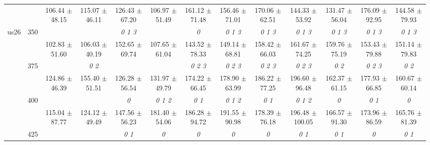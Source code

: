 \begin{table}[h]
{\begin{tabular}{
        ccccccccccccc}
 & & \cellcolor[HTML]{EFEFEF} 106.44 $\pm$ 48.15& \cellcolor[HTML]{EFEFEF} 115.07 $\pm$ 46.11& \cellcolor[HTML]{EFEFEF} 126.43 $\pm$ 67.20& \cellcolor[HTML]{EFEFEF} 106.97 $\pm$ 51.49& \cellcolor[HTML]{EFEFEF} 161.12 $\pm$ 71.48& \cellcolor[HTML]{EFEFEF} 156.46 $\pm$ 71.01& \cellcolor[HTML]{EFEFEF} 170.06 $\pm$ 62.51& \cellcolor[HTML]{EFEFEF} 144.33 $\pm$ 53.92& \cellcolor[HTML]{EFEFEF} 131.47 $\pm$ 56.04& \cellcolor[HTML]{EFEFEF} 176.09 $\pm$ 92.95& \cellcolor[HTML]{EFEFEF} 144.58 $\pm$ 79.93 \\ 
 \multirow{4}{*}{us26} & \multirow{2}{*}{350}& & & \textit{ 0 1 3 }& & \textit{ 0 }& \textit{ 0 1 3 }& \textit{ 0 1 3 }& \textit{ 0 1 3 }& \textit{ 0 1 3 }& \textit{ 0 1 3 }& \textit{ 0 1 3 } \\ 
 & & 102.83 $\pm$ 51.60& 106.03 $\pm$ 40.19& 152.65 $\pm$ 69.74& 107.65 $\pm$ 61.04& 143.52 $\pm$ 78.33& 149.14 $\pm$ 68.81& 158.42 $\pm$ 66.03& 161.67 $\pm$ 74.25& 159.76 $\pm$ 75.19& 153.43 $\pm$ 79.88& 151.14 $\pm$ 79.83 \\ 
 & \multirow{2}{*}{375}& \cellcolor[HTML]{EFEFEF} & \cellcolor[HTML]{EFEFEF} \textit{ 0 2 }& \cellcolor[HTML]{EFEFEF} & \cellcolor[HTML]{EFEFEF} & \cellcolor[HTML]{EFEFEF} \textit{ 0 2 3 }& \cellcolor[HTML]{EFEFEF} \textit{ 0 2 3 }& \cellcolor[HTML]{EFEFEF} \textit{ 0 2 3 }& \cellcolor[HTML]{EFEFEF} \textit{ 0 2 3 }& \cellcolor[HTML]{EFEFEF} \textit{ 0 2 }& \cellcolor[HTML]{EFEFEF} \textit{ 0 2 3 }& \cellcolor[HTML]{EFEFEF} \textit{ 0 2 } \\ 
 & & \cellcolor[HTML]{EFEFEF} 124.86 $\pm$ 46.39& \cellcolor[HTML]{EFEFEF} 155.40 $\pm$ 51.51& \cellcolor[HTML]{EFEFEF} 126.28 $\pm$ 56.54& \cellcolor[HTML]{EFEFEF} 131.97 $\pm$ 49.79& \cellcolor[HTML]{EFEFEF} 174.22 $\pm$ 66.45& \cellcolor[HTML]{EFEFEF} 178.90 $\pm$ 63.99& \cellcolor[HTML]{EFEFEF} 186.22 $\pm$ 77.25& \cellcolor[HTML]{EFEFEF} 196.60 $\pm$ 96.48& \cellcolor[HTML]{EFEFEF} 162.37 $\pm$ 61.15& \cellcolor[HTML]{EFEFEF} 177.93 $\pm$ 66.85& \cellcolor[HTML]{EFEFEF} 160.67 $\pm$ 60.14 \\ 
 & \multirow{2}{*}{400}& & & \textit{ 0 }& \textit{ 0 1 2 }& \textit{ 0 1 }& \textit{ 0 1 2 }& \textit{ 0 1 }& \textit{ 0 1 2 }& \textit{ 0 }& \textit{ 0 1 }& \textit{ 0 } \\ 
 & & 115.04 $\pm$ 87.77& 124.12 $\pm$ 49.49& 147.56 $\pm$ 56.23& 181.40 $\pm$ 54.06& 186.28 $\pm$ 94.72& 191.55 $\pm$ 90.98& 178.39 $\pm$ 76.18& 196.48 $\pm$ 100.05& 166.57 $\pm$ 91.30& 173.96 $\pm$ 86.59& 165.76 $\pm$ 81.39 \\ 
 & \multirow{2}{*}{425}& \cellcolor[HTML]{EFEFEF} & \cellcolor[HTML]{EFEFEF} & \cellcolor[HTML]{EFEFEF} \textit{ 0 1 }& \cellcolor[HTML]{EFEFEF} \textit{ 0 }& \cellcolor[HTML]{EFEFEF} \textit{ 0 }& \cellcolor[HTML]{EFEFEF} \textit{ 0 }& \cellcolor[HTML]{EFEFEF} \textit{ 0 }& \cellcolor[HTML]{EFEFEF} \textit{ 0 1 }& \cellcolor[HTML]{EFEFEF} \textit{ 0 1 }& \cellcolor[HTML]{EFEFEF} \textit{ 0 }& \cellcolor[HTML]{EFEFEF} \textit{ 0 1 } \\ 

\end{tabular}}
\end{table}
